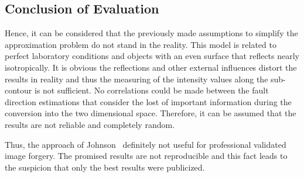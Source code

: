 \subsection{Conclusion of Evaluation}
Hence, it can be considered that the previously made assumptions to simplify the approximation problem do not stand in the reality. This model is related to perfect laboratory conditions and objects with an even surface that reflects nearly isotropically. It is obvious the reflections and other external influences distort the results in reality and thus the measuring of the intensity values along the sub-contour is not sufficient. No correlations could be made between the fault direction estimations that consider the lost of important information during the conversion into the two dimensional space. Therefore, it can be assumed that the results are not reliable and completely random.

Thus, the approach of Johnson~\cite{johnson} definitely not useful for professional validated image forgery. The promised results are not reproducible and this fact leads to the suspicion that only the best results were publicized.

\newpage